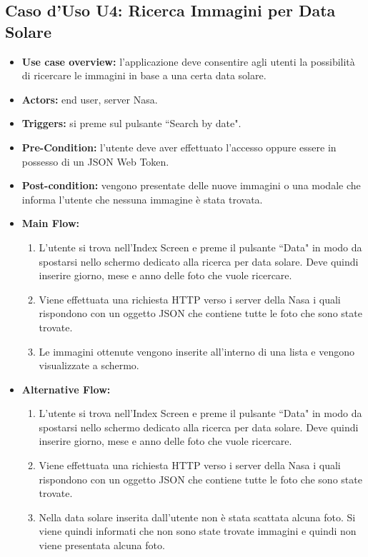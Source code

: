 \subsection*{Caso d'Uso U4: Ricerca Immagini per Data Solare}
\begin{itemize}
    \item  \textbf{Use case overview:} l'applicazione deve consentire agli utenti la possibilit\`a di ricercare le immagini in base a una certa data solare.
    \item \textbf{Actors:} end user, server Nasa.
    \item \textbf{Triggers:} si preme sul pulsante ``Search by date".
    \item \textbf{Pre-Condition:} l'utente deve aver effettuato l'accesso oppure essere in possesso di un JSON Web Token.
    \item \textbf{Post-condition:} vengono presentate delle nuove immagini o una modale che informa l'utente che nessuna immagine \`e stata trovata.
    \item \textbf{Main Flow:} \begin{enumerate}
              \item L'utente si trova nell'Index Screen e preme il pulsante ``Data" in modo da spostarsi nello schermo dedicato alla ricerca per data solare. Deve quindi inserire giorno, mese e anno delle foto che vuole ricercare.
              \item Viene effettuata una richiesta HTTP verso i server della Nasa i quali rispondono con un oggetto JSON che contiene tutte le foto che sono state trovate.
              \item Le immagini ottenute vengono inserite all'interno di una lista e vengono visualizzate a schermo.

          \end{enumerate}
    \item \textbf{Alternative Flow:}\begin{enumerate}
              \item L'utente si trova nell'Index Screen e preme il pulsante ``Data" in modo da spostarsi nello schermo dedicato alla ricerca per data solare. Deve quindi inserire giorno, mese e anno delle foto che vuole ricercare.
              \item Viene effettuata una richiesta HTTP verso i server della Nasa i quali rispondono con un oggetto JSON che contiene tutte le foto che sono state trovate.
              \item Nella data solare inserita dall'utente non \`e stata scattata alcuna foto. Si viene quindi informati che non sono state trovate immagini e quindi non viene presentata alcuna foto.

          \end{enumerate}
\end{itemize}

